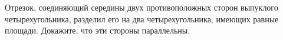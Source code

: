 \begin{ex}
	\begin{condition}
		Отрезок, соединяющий середины двух противоположных сторон выпуклого четырехугольника, разделил его на два четырехугольника, имеющих равные площади. Докажите, что эти стороны параллельны.
	\end{condition}
\end{ex}